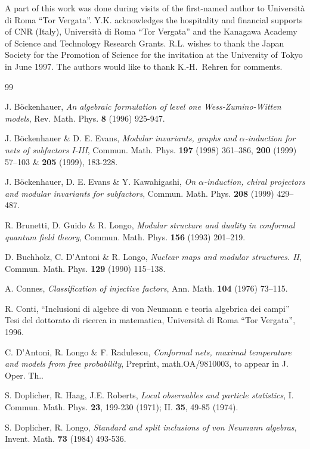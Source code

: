 \documentclass[12pt]{article}
\def\a{\alpha}
\begin{document}
A part of this work was done during visits of the first-named
author to Universit\`a di Roma ``Tor Vergata''.  Y.K. acknowledges
the hospitality and financial supports of CNR (Italy), Universit\`a
di Roma ``Tor Vergata'' and the Kanagawa Academy of Science and
Technology Research Grants.
R.L. wishes to thank the Japan Society for the Promotion
of Science for the invitation at the University of Tokyo in June
1997. The authors would like to thank K.-H.~Rehren for comments.

{\footnotesize \begin{thebibliography}{99}

J. B\"ockenhauer, {\it An algebraic formulation of level one
Wess-Zumino-Witten models},  Rev. Math. Phys. {\bf 8} (1996) 925-947.

J. B\"ockenhauer \& D. E. Evans,
{\it Modular invariants, graphs and $\alpha$-induction for
nets of subfactors I-III},
Commun. Math. Phys. {\bf 197} (1998) 361--386, {\bf 200} (1999) 
57--103 \& {\bf 205} (1999), 183-228.

J. B\"ockenhauer, D. E. Evans \& Y. Kawahigashi,
{\it On $\a$-induction, chiral projectors
and modular invariants for subfactors}, 
Commun. Math. Phys.  {\bf 208} (1999) 429--487.

 R. Brunetti, D. Guido \& R. Longo,
{\it Modular structure and duality in conformal
quantum field theory}, Commun. Math. Phys.
{\bf 156} (1993) 201--219.

 D. Buchholz, C. D'Antoni \& R. Longo,
{\it Nuclear maps and modular structures. II}, Commun. Math. Phys.
{\bf 129} (1990) 115--138.

 A. Connes, {\it Classification of injective factors}, Ann. 
Math. {\bf 104} (1976) 73--115.

 R. Conti, ``Inclusioni di algebre di von Neumann
e teoria algebrica dei campi'' Tesi del dottorato di ricerca in matematica,
Universit\`a di Roma ``Tor Vergata'', 1996.

 C. D'Antoni,  R. Longo \& F. Radulescu,
{\it Conformal nets, maximal temperature and models from free
probability}, Preprint, math.OA/9810003, to appear in J. Oper. Th..

   S. Doplicher, R. Haag, J.E. Roberts, {\it Local 
observables and particle statistics}, I. Commun. Math. Phys. 
{\bf 23},  199-230 (1971); II. {\bf 35}, 49-85 (1974).

  S. Doplicher, R. Longo, {\it Standard and split
inclusions of von Neumann algebras}, Invent. Math.  {\bf  73}
(1984)  493-536.


\end{thebibliography}}
\end{document}
